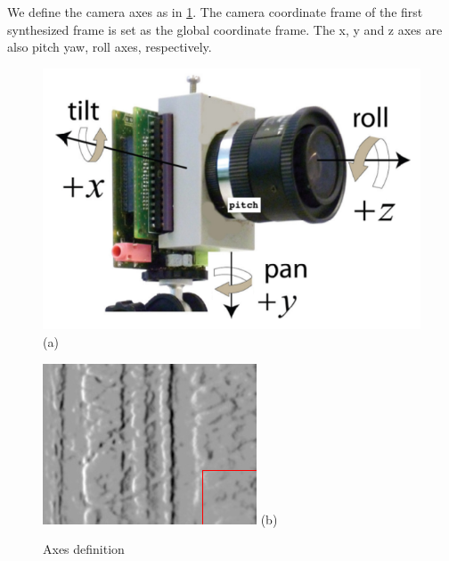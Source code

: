 We define the camera axes as in \cref{fig:axes}. The camera coordinate
frame of the first synthesized frame is set as the global coordinate
frame. The x, y and z axes are also pitch yaw, roll axes,
respectively.

\begin{figure}
  \begin{minipage}[t]{0.48\textwidth}
    \centering \includegraphics[width = \textwidth]{images/axes.png}
    (a)
  \end{minipage}
  \hfill
  \begin{minipage}[t]{0.48\textwidth}
    \centering \includegraphics[width =
    \textwidth]{images/slider_groundtruth.png} (b)
  \end{minipage}
  \hfill
  \caption{Axes definition}
  \label{fig:axes}
\end{figure}
